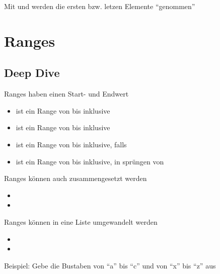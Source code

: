 \begin{frame}
    \slidehead
    Mit  und  werden die ersten bzw. letzen  Elemente \enquote{genommen}
\end{frame}

\livecoding

\section{Ranges}
\subsection{Deep Dive}
\begin{frame}
    \slidehead
    Ranges haben einen Start- und Endwert
    \begin{itemize}
        \item<1->  ist ein Range von  bis  inklusive
        \item<2->  ist ein Range von  bis  inklusive
        \item<3->  ist ein Range von  bis  inklusive, falls 
        \item<4->  ist ein Range von  bis  inklusive, in sprüngen von 
    \end{itemize}
    Ranges können auch zusammengesetzt werden
    \begin{itemize}
        \item<6-> 
        \item<7-> 
    \end{itemize}
    Ranges können in eine Liste umgewandelt werden
    \begin{itemize}
        \item<9-> 
        \item<9-> 
    \end{itemize}
\end{frame}

\begin{frame}
    \slidehead
    Beispiel: Gebe die Bustaben von \enquote{a} bis \enquote{c} und von \enquote{x} bis \enquote{z} aus
    \pause
\end{frame}

